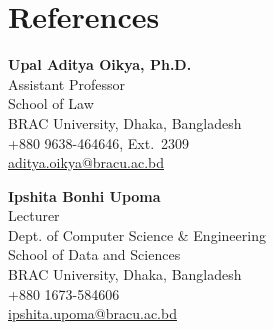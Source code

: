\documentclass[a4paper,11pt]{article}
\begin{document}
\section*{References}
\noindent
\begin{minipage}[t]{0.48\textwidth}
\raggedright
\textbf{Upal Aditya Oikya, Ph.D.}\\
Assistant Professor\\
School of Law\\
BRAC University, Dhaka, Bangladesh\\
+880 9638-464646, Ext.~2309\\
\href{mailto:aditya.oikya@bracu.ac.bd}{aditya.oikya@bracu.ac.bd}
\end{minipage}\hfill
\begin{minipage}[t]{0.48\textwidth}
\raggedright
\textbf{Ipshita Bonhi Upoma}\\
Lecturer\\
Dept. of Computer Science \& Engineering\\
School of Data and Sciences\\
BRAC University, Dhaka, Bangladesh\\
+880 1673-584606\\
\href{mailto:ipshita.upoma@bracu.ac.bd}{ipshita.upoma@bracu.ac.bd}
\end{minipage}
\end{document}
